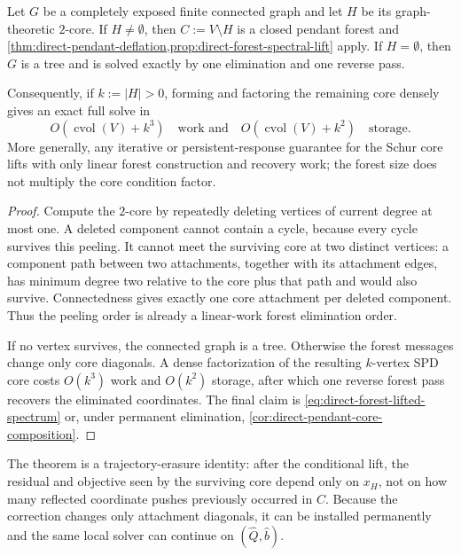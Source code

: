 \begin{corollary}
\label{cor:direct-two-core-reduction}
Let $G$ be a completely exposed finite connected graph and let $H$ be its
graph-theoretic $2$-core.  If $H\neq\emptyset$, then
$C:=V\setminus H$ is a closed pendant forest and
\cref{thm:direct-pendant-deflation,prop:direct-forest-spectral-lift} apply.
If $H=\emptyset$, then $G$ is a tree and is solved exactly by one elimination
and one reverse pass.

Consequently, if $k:=|H|>0$, forming and factoring the remaining core densely
gives an exact full solve in
\begin{equation}
 O\!\left(\operatorname{cvol}(V)+k^3\right)
 \quad\text{work and}\quad
 O\!\left(\operatorname{cvol}(V)+k^2\right)
 \quad\text{storage}.
 \label{eq:direct-two-core-dense-work}
\end{equation}
More generally, any iterative or persistent-response guarantee for the Schur
core lifts with only linear forest construction and recovery work; the forest
size does not multiply the core condition factor.
\end{corollary}

\begin{proof}
Compute the $2$-core by repeatedly deleting vertices of current degree at most
one.  A deleted component cannot contain a cycle, because every cycle survives
this peeling.  It cannot meet the surviving core at two distinct vertices:
a component path between two attachments, together with its attachment edges,
has minimum degree two relative to the core plus that path and would also
survive.  Connectedness gives exactly one core attachment per deleted
component.  Thus the peeling order is already a linear-work forest
elimination order.

If no vertex survives, the connected graph is a tree.  Otherwise the forest
messages change only core diagonals.  A dense factorization of the resulting
$k$-vertex SPD core costs $O(k^3)$ work and $O(k^2)$ storage, after which one
reverse forest pass recovers the eliminated coordinates.  The final claim is
\cref{eq:direct-forest-lifted-spectrum} or, under permanent elimination,
\cref{cor:direct-pendant-core-composition}.
\end{proof}

The theorem is a trajectory-erasure identity: after the conditional lift,
the residual and objective seen by the surviving core depend only on
$x_H$, not on how many reflected coordinate pushes previously occurred in
$C$.  Because the correction changes only attachment diagonals, it can be
installed permanently and the same local solver can continue on
$(\widehat Q,\widehat b)$.

